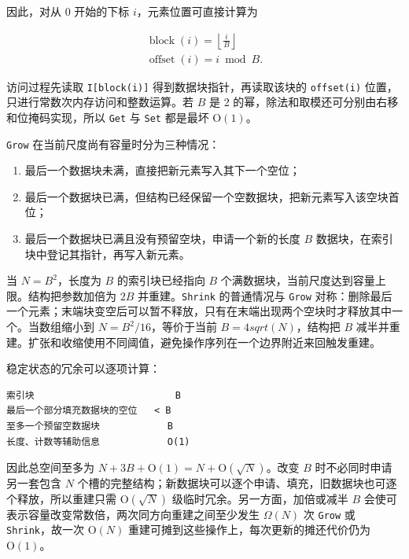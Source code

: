 \documentclass[UTF8,11pt,a4paper]{ctexart}
\begin{document}
因此，对从 0 开始的下标 $i$，元素位置可直接计算为\par

\[
\begin{aligned}
  \operatorname{block}(i)=\left\lfloor\frac{i}{B}\right\rfloor \\
  \operatorname{offset}(i)=i\bmod B.
\end{aligned}
\]

访问过程先读取 \textnormal{\texttt{I[block(i)]}} 得到数据块指针，再读取该块的 \textnormal{\texttt{offset(i)}} 位置，只进行常数次内存访问和整数运算。若 $B$ 是 2 的幂，除法和取模还可分别由右移和位掩码实现，所以 \textnormal{\texttt{Get}} 与 \textnormal{\texttt{Set}} 都是最坏 $\mathrm{O}(1)$。\par

\textnormal{\texttt{Grow}} 在当前尺度尚有容量时分为三种情况：\par

\begin{enumerate}
\item 最后一个数据块未满，直接把新元素写入其下一个空位；
\item 最后一个数据块已满，但结构已经保留一个空数据块，把新元素写入该空块首位；
\item 最后一个数据块已满且没有预留空块，申请一个新的长度 $B$ 数据块，在索引块中登记其指针，再写入新元素。
\end{enumerate}

当 $N=B^2$，长度为 $B$ 的索引块已经指向 $B$ 个满数据块，当前尺度达到容量上限。结构把参数加倍为 $2B$ 并重建。\textnormal{\texttt{Shrink}} 的普通情况与 \textnormal{\texttt{Grow}} 对称：删除最后一个元素；末端块变空后可以暂不释放，只有在末端出现两个空块时才释放其中一个。当数组缩小到 $N=B^2/16$，等价于当前 $B=4sqrt(N)$，结构把 $B$ 减半并重建。扩张和收缩使用不同阈值，避免操作序列在一个边界附近来回触发重建。\par

稳定状态的冗余可以逐项计算：\par

\begin{Verbatim}[fontsize=\scriptsize]
索引块                         B
最后一个部分填充数据块的空位   < B
至多一个预留空数据块            B
长度、计数等辅助信息            O(1)
\end{Verbatim}

因此总空间至多为 $N+3B+\mathrm{O}(1)=N+\mathrm{O}(\sqrt{N})$。改变 $B$ 时不必同时申请另一套包含 $N$ 个槽的完整结构；新数据块可以逐个申请、填充，旧数据块也可逐个释放，所以重建只需 $\mathrm{O}(\sqrt{N})$ 级临时冗余。另一方面，加倍或减半 $B$ 会使可表示容量改变常数倍，两次同方向重建之间至少发生 $\Omega(N)$ 次 \textnormal{\texttt{Grow}} 或 \textnormal{\texttt{Shrink}}，故一次 $\mathrm{O}(N)$ 重建可摊到这些操作上，每次更新的摊还代价仍为 $\mathrm{O}(1)$。\par
\end{document}

